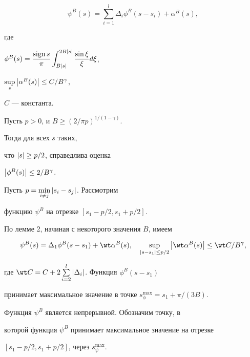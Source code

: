 $$


\psi^B(s)=\sum\limits_{i=1}^l\Delta_i\phi^B(s-s_i) +\alpha^B(s),


$$


где


$\phi^B(s)=\dfrac {\sign s}{\pi }\displaystyle \int_{B| s|}


^{2B| s|} \dfrac {\sin \xi }{\xi } d\xi$,


$\sup\limits_s\left| \alpha^B(s) \right |\leq C/B^{\gamma}$,


$C$ --- константа.





\begin{lem}


Пусть $p>0$, и $B\geq(2/\pi p)^{1/(1-\gamma)}$.


Тогда для всех $s$ таких,


что $\left| s \right |\geq p/2$, справедлива оценка


$\left| \phi^B(s) \right | \leq 2/B^{\gamma}$.


\end{lem}





Пусть $p=\min\limits_{i\ne j}\left| s_i-s_j \right |$. Рассмотрим


функцию $\psi^B$ на отрезке $[s_1-p/2,s_1+p/2]$.


По лемме 2, начиная с некоторого значения $B$, имеем


$$






\psi^B(s)=\Delta_1\phi^B(s-s_1) +\wt\alpha^B(s),\quad


\sup\limits_{\Mod{s-s_1}\leq p/2}\Mod{\wt\alpha^B(s)}\leq \wt C/B^\gamma,




$$


где $\wt C=C+2\sum\limits_{i=2}^l|\Delta_i|$. Функция $\phi^B(s-s_1)$


принимает максимальное значение в точке $s^{\max}_{\phi}=s_1+\pi/(3B)$.


Функция $\psi^B$ является непрерывной. Обозначим точку, в


которой функция $\psi^B$ принимает максимальное значение на отрезке


$[s_1-p/2,s_1+p/2]$, через $s^{\max}_{\psi}$.





